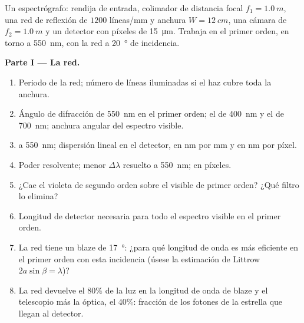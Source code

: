 \begin{problem}
\label{pb:b2:gratings:1}

Un espectrógrafo: rendija de entrada, colimador de distancia focal $f_1 =
\qty{1.0}{m}$, una red de reflexión de $1200$ líneas/mm y anchura $W =
\qty{12}{cm}$, una cámara de $f_2 = \qty{1.0}{m}$ y un detector con píxeles de \qty{15}{\micro m}.
Trabaja en el primer orden, en torno a \qty{550}{nm}, con la
red a \qty{20}{\degree} de incidencia.

\medskip
\noindent\textbf{Parte I --- La red.}
\begin{enumerate}
  \item Periodo de la red; número de líneas iluminadas si el haz cubre
        toda la anchura.
  \item Ángulo de difracción de \qty{550}{nm} en el primer orden; el de
        \qty{400}{nm} y el de \qty{700}{nm}; anchura angular del espectro
        visible.
  \item {} a \qty{550}{nm}; dispersión lineal en el
        detector, en nm por mm y en nm por píxel.
  \item Poder resolvente; menor $\Delta\lambda$ resuelto a \qty{550}{nm}; en
        píxeles.
  \item ¿Cae el violeta de segundo orden sobre el visible de primer
        orden? ¿Qué filtro lo elimina?
  \item Longitud de detector necesaria para todo el espectro visible en
        el primer orden.
  \item La red tiene un blaze de \qty{17}{\degree}: ¿para qué longitud de onda es
        más eficiente en el primer orden con esta incidencia (úsese
        la estimación de Littrow $2a\sin\beta = \lambda$)?
  \item La red devuelve el $80\%$ de la luz en la longitud de onda de blaze
        y el telescopio más la óptica, el $40\%$: fracción de los fotones
        de la estrella que llegan al detector.
\end{enumerate}


\end{problem}
